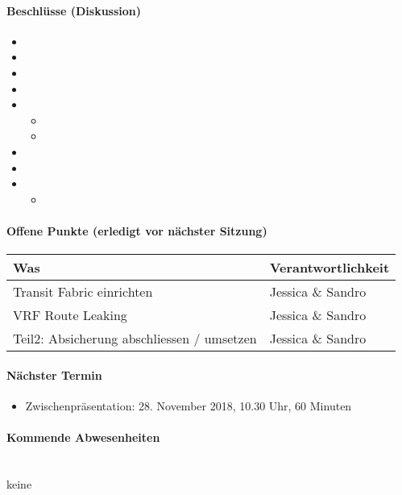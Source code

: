 \paragraph{Beschlüsse (Diskussion)}
\begin{itemize}	
	\item 
	\item 
	\item
	\item 
	\item
	\begin{itemize}
		\item 
		\item 
	\end{itemize}
	\item
	\item 
	\item 
	\begin{itemize}
		\item 
	\end{itemize}
\end{itemize}

\paragraph{Offene Punkte (erledigt vor nächster Sitzung)} \mbox{}
\begin{table}[H]
	\centering
	\begin{tabularx}{\textwidth}{X | p{4.5cm}}
		\rowcolor{gray!50}
		\textbf{Was} & \textbf{Verantwortlichkeit} \\
		\hline	
		Transit Fabric einrichten & Jessica \& Sandro  \\
		VRF Route Leaking & Jessica \& Sandro \\
		Teil2: Absicherung abschliessen / umsetzen & Jessica \& Sandro \\
	\end{tabularx}
	\label{tab:my-label}
\end{table}

\paragraph{Nächster Termin}
\begin{itemize}	
	\item Zwischenpräsentation: 28. November 2018, 10.30 Uhr, 60 Minuten
\end{itemize}

\paragraph{Kommende Abwesenheiten} \mbox{}\\
keine





